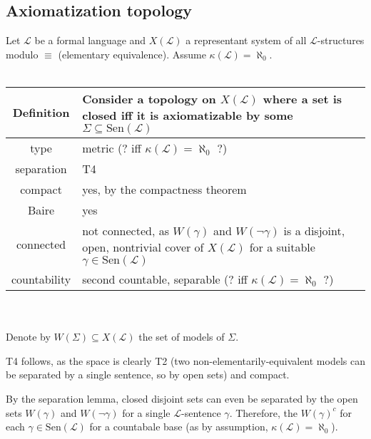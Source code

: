 \documentclass{scrartcl}
\begin{document}
\subsection{Axiomatization topology}
Let $\mathcal{L}$ be a formal language and $X(\mathcal{L})$ a representant system of all $\mathcal{L}$-structures modulo $\equiv$ (elementary equivalence).
Assume $\kappa(\mathcal{L}) = \aleph_0$.
\\\\
\begin{tabular}{c | p{}}
    Definition & Consider a topology on $X(\mathcal{L})$ where a set is closed iff it is axiomatizable by some $\Sigma \subseteq \mathrm{Sen}(\mathcal{L})$ \\
    \hline
    type & metric (? iff $\kappa(\mathcal{L}) = \aleph_0$ ?) \\
    separation & T4 \\
    compact & yes, by the compactness theorem \\
    Baire & yes \\
    connected & not connected, as $W(\gamma)$ and $W(\neg\gamma)$ is a disjoint, open, nontrivial cover of $X(\mathcal{L})$ for a suitable $\gamma \in \mathrm{Sen}(\mathcal{L})$ \\
    countability & second countable, separable (? iff $\kappa(\mathcal{L}) = \aleph_0$ ?)
\end{tabular}
\\\\
Denote by $W(\Sigma) \subseteq X(\mathcal{L})$ the set of models of $\Sigma$. 

T4 follows, as the space is clearly T2 (two non-elementarily-equivalent models can be separated by a single sentence, so by open sets) and compact.

By the separation lemma, closed disjoint sets can even be separated by the open sets $W(\gamma)$ and $W(\neg\gamma)$ for a single $\mathcal{L}$-sentence $\gamma$.
Therefore, the $W(\gamma)^c$ for each $\gamma \in \mathrm{Sen}(\mathcal{L})$ for a countabale base (as by assumption, $\kappa(\mathcal{L}) = \aleph_0$).
\end{document}
